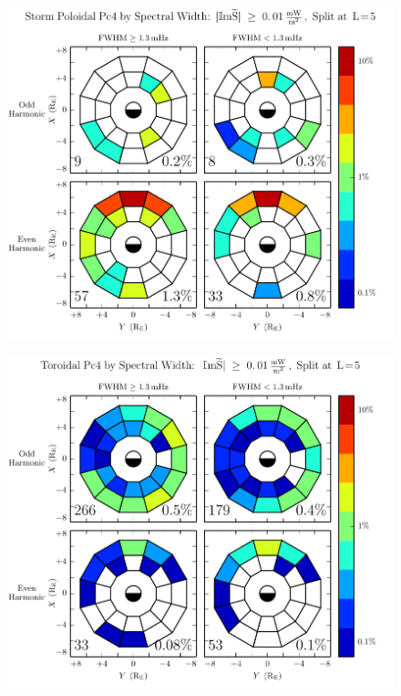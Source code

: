 \begin{figure}[!htb]
    \centering
    \includegraphics[width=\textwidth]{figures/fwhm_rate_p_storm.pdf}
    \caption[Poloidal Pc4 Rate by Spectral Width: Dst$< \SI{-30}{\nT}$]{
    }
    \label{fig_fwhm_rate_p_storm}
\end{figure}

\begin{figure}[!htb]
    \centering
    \includegraphics[width=\textwidth]{figures/fwhm_rate_t_all.pdf}
    \caption[Toroidal Pc4 Rate by Spectral Width]{
    }
    \label{fig_fwhm_rate_t_all}
\end{figure}

